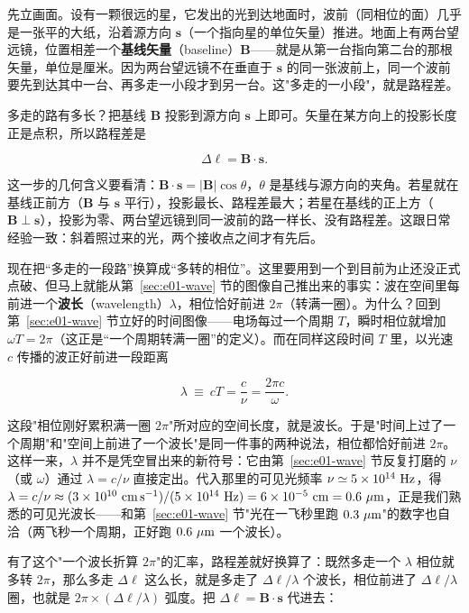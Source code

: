 先立画面。设有一颗很远的星，它发出的光到达地面时，波前（同相位的面）几乎是一张平的大纸，沿着源方向 \(\bm s\)（一个指向星的单位矢量）推进。地面上有两台望远镜，位置相差一个\textbf{基线矢量}（baseline）\(\bm B\)——就是从第一台指向第二台的那根矢量，单位是厘米。因为两台望远镜不在垂直于 \(\bm s\) 的同一张波前上，同一个波前要先到达其中一台、再多走一小段才到另一台。这"多走的一小段"，就是路程差。

多走的路有多长？把基线 \(\bm B\) 投影到源方向 \(\bm s\) 上即可。矢量在某方向上的投影长度正是点积，所以路程差是

\[
  \Delta \ell=\bm B\cdot\bm s .
\]

这一步的几何含义要看清：\(\bm B\cdot\bm s=|\bm B|\cos\theta\)，\(\theta\) 是基线与源方向的夹角。若星就在基线正前方（\(\bm B\) 与 \(\bm s\) 平行），投影最长、路程差最大；若星在基线的正上方（\(\bm B\perp\bm s\)），投影为零、两台望远镜到同一波前的路一样长、没有路程差。这跟日常经验一致：斜着照过来的光，两个接收点之间才有先后。

现在把“多走的一段路”换算成“多转的相位”。这里要用到一个到目前为止还没正式点破、但马上就能从第~\ref{sec:e01-wave} 节的图像自己推出来的事实：波在空间里每前进一个\textbf{波长}（wavelength）\(\lambda\)，相位恰好前进 \(2\pi\)（转满一圈）。为什么？回到第~\ref{sec:e01-wave} 节立好的时间图像——电场每过一个周期 \(T\)，瞬时相位就增加 \(\omega T=2\pi\)（这正是“一个周期转满一圈”的定义）。而在同样这段时间 \(T\) 里，以光速 \(c\) 传播的波正好前进一段距离

\[
  \lambda\ \equiv\ cT=\frac{c}{\nu}=\frac{2\pi c}{\omega}.
\]

这段"相位刚好累积满一圈 \(2\pi\)"所对应的空间长度，就是波长。于是"时间上过了一个周期"和"空间上前进了一个波长"是同一件事的两种说法，相位都恰好前进 \(2\pi\)。这样一来，\(\lambda\) 并不是凭空冒出来的新符号：它由第~\ref{sec:e01-wave} 节反复打磨的 \(\nu\)（或 \(\omega\)）通过 \(\lambda=c/\nu\) 直接定出。代入那里的可见光频率 \(\nu\simeq5\times10^{14}\ {\rm Hz}\)，得 \(\lambda=c/\nu\approx(3\times10^{10}\ {\rm cm\,s^{-1}})/(5\times10^{14}\ {\rm Hz})=6\times10^{-5}\ {\rm cm}=0.6\ \mu{\rm m}\)，正是我们熟悉的可见光波长——和第~\ref{sec:e01-wave} 节"光在一飞秒里跑 \(0.3\ \mu{\rm m}\)"的数字也自洽（两飞秒一个周期，正好跑 \(0.6\ \mu{\rm m}\) 一个波长）。

有了这个"一个波长折算 \(2\pi\)"的汇率，路程差就好换算了：既然多走一个 \(\lambda\) 相位就多转 \(2\pi\)，那么多走 \(\Delta\ell\) 这么长，就是多走了 \(\Delta\ell/\lambda\) 个波长，相位前进了 \(\Delta\ell/\lambda\) 圈，也就是 \(2\pi\times(\Delta\ell/\lambda)\) 弧度。把 \(\Delta\ell=\bm B\cdot\bm s\) 代进去：

